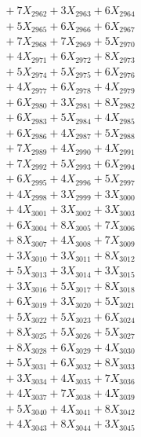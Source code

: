 \documentclass[a4paper,10pt]{article}
\begin{document}
{\begin{align}
&\;  + 7 X_{2962} + 3 X_{2963} + 6 X_{2964} \\[0.3ex]
&\;  + 5 X_{2965} + 6 X_{2966} + 6 X_{2967} \\[0.3ex]
&\;  + 7 X_{2968} + 7 X_{2969} + 5 X_{2970} \\[0.3ex]
&\;  + 4 X_{2971} + 6 X_{2972} + 8 X_{2973} \\[0.3ex]
&\;  + 5 X_{2974} + 5 X_{2975} + 6 X_{2976} \\[0.3ex]
&\;  + 4 X_{2977} + 6 X_{2978} + 4 X_{2979} \\[0.5ex]\allowbreak
&\;  + 6 X_{2980} + 3 X_{2981} + 8 X_{2982} \\[0.3ex]
&\;  + 6 X_{2983} + 5 X_{2984} + 4 X_{2985} \\[0.3ex]
&\;  + 6 X_{2986} + 4 X_{2987} + 5 X_{2988} \\[0.3ex]
&\;  + 7 X_{2989} + 4 X_{2990} + 4 X_{2991} \\[0.3ex]
&\;  + 7 X_{2992} + 5 X_{2993} + 6 X_{2994} \\[0.3ex]
&\;  + 6 X_{2995} + 4 X_{2996} + 5 X_{2997} \\[0.3ex]
&\;  + 4 X_{2998} + 3 X_{2999} + 3 X_{3000} \\[0.3ex]
&\;  + 4 X_{3001} + 3 X_{3002} + 3 X_{3003} \\[0.3ex]
&\;  + 6 X_{3004} + 8 X_{3005} + 7 X_{3006} \\[0.3ex]
&\;  + 8 X_{3007} + 4 X_{3008} + 7 X_{3009} \\[0.5ex]\allowbreak
&\;  + 3 X_{3010} + 3 X_{3011} + 8 X_{3012} \\[0.3ex]
&\;  + 5 X_{3013} + 3 X_{3014} + 3 X_{3015} \\[0.3ex]
&\;  + 3 X_{3016} + 5 X_{3017} + 8 X_{3018} \\[0.3ex]
&\;  + 6 X_{3019} + 3 X_{3020} + 5 X_{3021} \\[0.3ex]
&\;  + 5 X_{3022} + 5 X_{3023} + 6 X_{3024} \\[0.3ex]
&\;  + 8 X_{3025} + 5 X_{3026} + 5 X_{3027} \\[0.3ex]
&\;  + 8 X_{3028} + 6 X_{3029} + 4 X_{3030} \\[0.3ex]
&\;  + 5 X_{3031} + 6 X_{3032} + 8 X_{3033} \\[0.3ex]
&\;  + 3 X_{3034} + 4 X_{3035} + 7 X_{3036} \\[0.3ex]
&\;  + 4 X_{3037} + 7 X_{3038} + 4 X_{3039} \\[0.5ex]\allowbreak
&\;  + 5 X_{3040} + 4 X_{3041} + 8 X_{3042} \\[0.3ex]
&\;  + 4 X_{3043} + 8 X_{3044} + 3 X_{3045} \\[0.3ex]

\end{align}}
\end{document}
